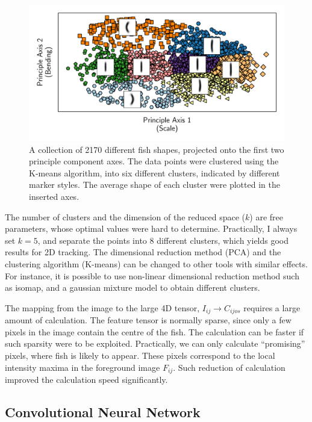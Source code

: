 \documentclass[11pt,twoside]{report}
\begin{document}
\begin{figure}
  \includegraphics[width=\linewidth]{fish-pca-proj}
  \caption[PCA analysis of the fish shape]{
  A collection of 2170 different fish shapes, projected onto the first two principle component axes. The data points were clustered using the K-means algorithm, into six different clusters, indicated by different marker styles. The average shape of each cluster were plotted in the inserted axes.
  }
  \label{fig:fish_pca}
\end{figure}


The number of clusters and the dimension of the reduced space ($k$) are free parameters, whose optimal values were hard to determine. Practically, I always set $k=5$, and separate the points into 8 different clusters, which yields good results for 2D tracking. The dimensional reduction method (PCA) and the clustering algorithm (K-means) can be changed to other tools with similar effects. For instance, it is possible to use non-linear dimensional reduction method such as isomap, and a gaussian mixture model to obtain different clusters.

The mapping from the image to the large 4D tensor, $I_{ij} \rightarrow C_{ijos}$ requires a large amount of calculation. The feature tensor is normally sparse, since only a few pixels in the image contain the centre of the fish. The calculation can be faster if such sparsity were to be exploited.
Practically, we can only calculate ``promising'' pixels, where fish is likely to appear. These pixels correspond to the local intensity maxima in the foreground image $F_{ij}$. Such reduction of calculation improved the calculation speed significantly.


\subsection{Convolutional Neural Network}
\label{section:cnn}
\end{document}

